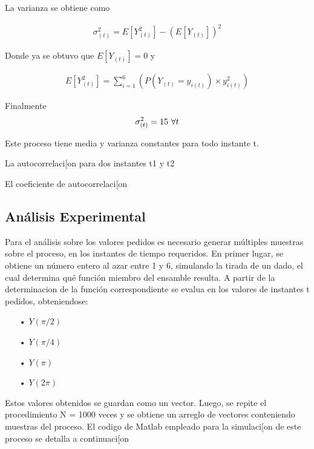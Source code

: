 La varianza se obtiene como

\begin{equation*}
\begin{gathered}
	\sigma^{2}_{(t)} = E\left[Y_{(t)}^{2}\right]- \left(E\left[Y_{(t)}\right]\right)^{2}  
\end{gathered}
\end{equation*}

Donde ya se obtuvo que $E\left[Y_{(t)}\right] = 0$ y 

\begin{equation*}
\begin{gathered}
	E\left[Y_{(t)}^{2}\right] = \sum_{i=1}^{6}\left( P(Y_{(t)} = y_{i(t)}) \times y_{i(t)}^{2}\right) 
\end{gathered}
\end{equation*}

Finalmente
\begin{equation*}
\begin{gathered}
	\sigma^{2}_{(t)} = 15 $   $ \forall t  
\end{gathered}
\end{equation*}

Este proceso tiene media y varianza constantes para todo instante t.

La autocorrelaci[on para dos instantes t1 y t2


El coeficiente de autocorrelaci[on 


\subsection{Análisis Experimental}

Para el análisis sobre los valores pedidos es necesario generar múltiples muestras sobre el proceso, en los instantes de tiempo requeridos. En primer lugar, se obtiene un número entero al azar entre 1 y 6, simulando la tirada de un dado, el cual determina qué función miembro del ensamble resulta.
A partir de la determinacion de la función correspondiente se evalua en los valores de instantes t pedidos, obteniendose:

\begin{enumerate}
   \item[•] $Y(\pi/2)$
   \item[•] $Y(\pi/4)$
   \item[•] $Y(\pi)$
   \item[•] $Y(2\pi)$
\end{enumerate}

Estos valores obtenidos se guardan como un vector. Luego, se repite el procedimiento N = 1000 veces 
y se obtiene un arreglo de vectores conteniendo muestras del proceso.
El codigo de Matlab empleado para la simulaci[on de este proceso se detalla a continuaci[on 
\\

